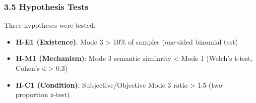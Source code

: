 \subsubsection{3.5 Hypothesis Tests}

Three hypotheses were tested:

\begin{itemize}
\item \textbf{H-E1 (Existence)}: Mode 3 > 10\% of samples (one-sided binomial test)
\item \textbf{H-M1 (Mechanism)}: Mode 3 semantic similarity < Mode 1 (Welch's t-test, Cohen's d > 0.3)
\item \textbf{H-C1 (Condition)}: Subjective/Objective Mode 3 ratio > 1.5 (two-proportion z-test)
\end{itemize}
